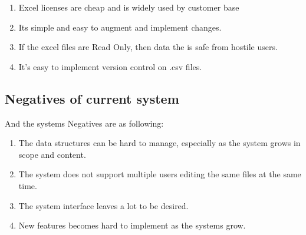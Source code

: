 \begin{enumerate}
	\item Excel licenses are cheap and is widely used by customer base
	\item Its simple and easy to augment and implement changes.
	\item If the excel files are Read Only, then data the is safe from hostile users.
	\item It's easy to implement version control on .csv files. 
\end{enumerate}

\subsection{Negatives of current system} 
And the systems Negatives are as following: 

\begin{enumerate}
	\item The data structures can be hard to manage, especially as the system grows in scope and content.
	\item The system does not support multiple users editing the same files at the same time.
	\item The system interface leaves a lot to be desired.
	\item New features becomes hard to implement as the systems grow.
\end{enumerate}

